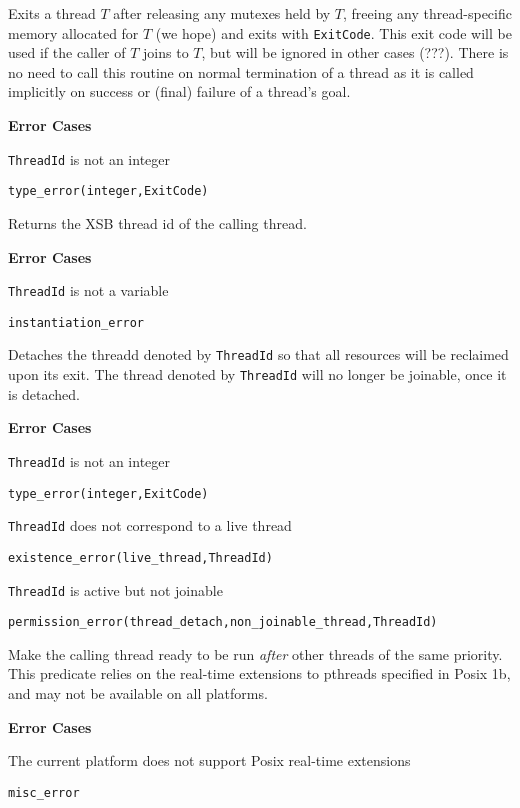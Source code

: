 \begin{description}
%
Exits a thread $T$ after releasing any mutexes held by $T$, freeing
any thread-specific memory allocated for $T$ (we hope) and exits with
{\tt ExitCode}.  This exit code will be used if the caller of $T$
joins to $T$, but will be ignored in other cases (???).  There is no
need to call this routine on normal termination of a thread as it is
called implicitly on success or (final) failure of a thread's goal.

{\bf Error Cases}
\bi
\item 	{\tt ThreadId} is not an integer
\bi
\item 	{\tt type\_error(integer,ExitCode)}
\ei
\ei

%
Returns the XSB thread id of the calling thread.

{\bf Error Cases}
\bi
\item 	{\tt ThreadId} is not a variable
\bi
\item 	{\tt instantiation\_error}
\ei
\ei

%
Detaches the threadd denoted by {\tt ThreadId} so that all resources
will be reclaimed upon its exit.  The thread denoted by {\tt ThreadId}
will no longer be joinable, once it is detached.

{\bf Error Cases}
\bi
\item 	{\tt ThreadId} is not an integer
\bi
\item 	{\tt type\_error(integer,ExitCode)}
\ei
\item   {\tt ThreadId} does not correspond to a live thread
\bi
\item   {\tt existence\_error(live\_thread,ThreadId)}
\ei
\item 	{\tt ThreadId} is active but not joinable
\bi
\item 	{\tt permission\_error(thread\_detach,non\_joinable\_thread,ThreadId)}
\ei
\ei

% 
Make the calling thread ready to be run {\em after} other threads of
the same priority.  This predicate relies on the real-time extensions
to pthreads specified in Posix 1b, and may not be available on all
platforms.

{\bf Error Cases}
\bi
\item 	The current platform does not support Posix real-time extensions
\bi
\item 	{\tt misc\_error}
\ei
\ei


\end{description}
